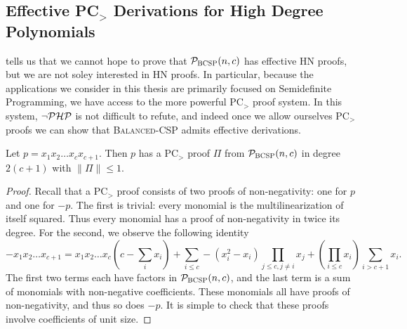 \subsection{Effective PC$_>$ Derivations for High Degree Polynomials}
 tells us that we cannot hope to prove that $\mathcal P_{\textsc{BCSP}}(n,c)$ has effective HN proofs, but we are not soley interested in HN proofs. In particular, because the applications we consider in this thesis are primarily focused on Semidefinite Programming, we have access to the more powerful PC$_>$ proof system. In this system, $\neg\mathcal P\mathcal H\mathcal P$ is not difficult to refute, and indeed once we allow ourselves PC$_>$ proofs we can show that \textsc{Balanced-CSP} admits effective derivations.
\begin{lemma}\label{lem:highdeg-easy}
Let $p = x_1x_2\dots x_c x_{c+1}$. Then $p$ has a PC$_>$ proof $\Pi$ from $\mathcal P_{\textsc{BCSP}}(n,c)$ in degree $2(c+1)$ with $\|\Pi\| \leq 1$. 
\end{lemma}
\begin{proof}
Recall that a PC$_>$ proof consists of two proofs of non-negativity: one for $p$ and one for $-p$. The first is trivial: every monomial is the multilinearization of itself squared. Thus every monomial has a proof of non-negativity in twice its degree. For the second, we observe the following identity
\[-x_1x_2\dots x_{c+1} = x_1x_2\dots x_c\left(c - \sum_i x_i\right) + \sum_{i \leq c} -(x_i^2 - x_i) \prod_{j \leq c, j\neq i} x_j + \left(\prod_{i \leq c} x_i\right) \sum_{i > c+1} x_i. \]
The first two terms each have factors in $\mathcal P_{\textsc{BCSP}}(n,c)$, and the last term is a sum of monomials with non-negative coefficients. These monomials all have proofs of non-negativity, and thus so does $-p$. It is simple to check that these proofs involve coefficients of unit size. 
\end{proof}

